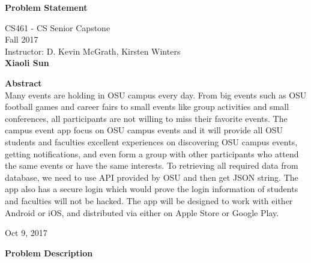 \documentclass[10pt,letterpaper]{article}
\begin{document}
\begin{titlepage}
\begin{center}
    \Huge
    \textbf{Problem Statement}
    
    \vspace{0.5in}
    \large
    CS461 - CS Senior Capstone\\
    
    \vspace{0.2in}
    \large
    Fall 2017\\
    
    \vspace{0.2in}
    \large
    Instructor: D. Kevin McGrath, Kirsten Winters\\
    
    \vspace{0.2in}
    \textbf{Xiaoli Sun}
    
    \vspace{0.5in}
    \textbf{Abstract}\\
    \vspace{0.2in}
    Many events are holding in OSU campus every day. From big events such as OSU football games and career fairs to small events like group activities and small conferences, all participants are not willing to miss their favorite events. The campus event app focus on OSU campus events and it will provide all OSU students and faculties excellent experiences on discovering OSU campus events, getting notifications, and even form a group with other participants who attend the same events or have the same interests. To retrieving all required data from database, we need to use API provided by OSU and then get JSON string. The app also has a secure login which would prove the login information of students and faculties will not be hacked. The app will be designed to work with either Android or iOS, and distributed via either on Apple Store or Google Play.
    
    \vspace{0.3in}
    \vfill
    
    Oct 9, 2017

\end{center}
\end{titlepage}

\newpage

\begin{center}
\large
\textbf{Problem Description}
\end{center}
\end{document}
